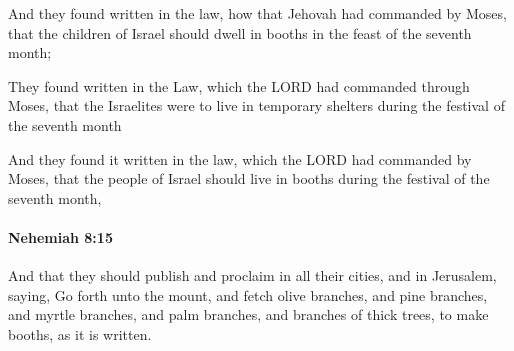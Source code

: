 			\begin{versebox}
					\item[BHS] 
					\item[LXX] 
					\item[ASV] And they found written in the law, how that Jehovah had commanded by Moses, that the children of Israel should dwell in booths in the feast of the seventh month;
					\item[NIV] They found written in the Law, which the LORD had commanded through Moses, that the Israelites were to live in temporary shelters during the festival of the seventh month
					\item[NRSV] And they found it written in the law, which the LORD had commanded by Moses, that the people of Israel should live in booths during the festival of the seventh month,
			\end{versebox}

		\paragraph{Nehemiah 8:15} %
			\label{NEHEMIAH-8-15}

			And that they should publish and proclaim in all their cities, and in Jerusalem, saying, Go forth unto the mount, and fetch olive branches, and pine branches, and myrtle branches, and palm branches, and branches of thick trees, to make booths, as it is written.

